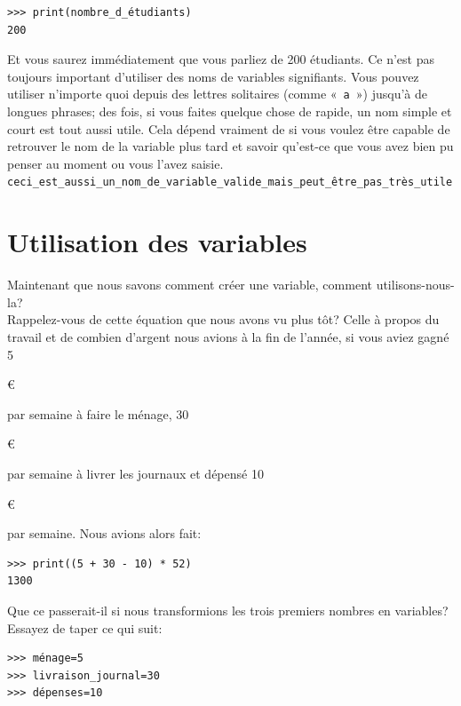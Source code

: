 \begin{Verbatim}[frame=single,rulecolor=\color{mbleu}, label=à taper]
>>> print(nombre_d_étudiants)
200
\end{Verbatim}

Et vous saurez immédiatement que vous parliez de 200 étudiants. Ce n'est pas toujours important d'utiliser des noms de variables signifiants. Vous pouvez utiliser n'importe quoi depuis des lettres solitaires (comme «~\texttt{a}~») jusqu'à de longues phrases; des fois, si vous faites quelque chose de rapide, un nom simple et court est tout aussi utile. Cela dépend vraiment de si vous voulez être capable de retrouver le nom de la variable plus tard et savoir qu'est-ce que vous avez bien pu penser au moment ou vous l'avez saisie.\\

\texttt{ceci\_est\_aussi\_un\_nom\_de\_variable\_valide\_mais\_peut\_être\_pas\_très\_utile}\\

\section{Utilisation des variables}

Maintenant que nous savons comment créer une variable, comment utilisons-nous-la?\\ Rappelez-vous de cette équation que nous avons vu plus tôt? Celle à propos du travail et de combien d'argent nous avions à la fin de l'année, si vous aviez gagné 5\begin{small}\euro\end{small} par semaine à faire le ménage, 30\begin{small}\euro\end{small} par semaine à livrer les journaux et dépensé 10\begin{small}\euro\end{small} par semaine. Nous avions alors fait:

\begin{Verbatim}[frame=single,rulecolor=\color{mbleu}, label=à taper]
>>> print((5 + 30 - 10) * 52)
1300
\end{Verbatim}

Que ce passerait-il si nous transformions les trois premiers nombres en variables? Essayez de taper ce qui suit:

\begin{Verbatim}[frame=single,rulecolor=\color{mbleu}, label=à taper]
>>> ménage=5
>>> livraison_journal=30
>>> dépenses=10
\end{Verbatim}
 

